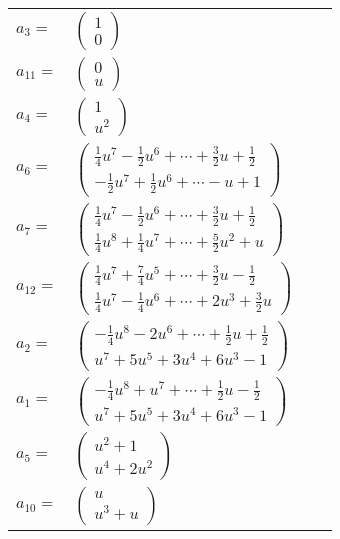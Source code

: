 \documentclass[1p]{elsarticle_modified}
\theoremstyle{definition}
\begin{document}
\begin{tabular}{m{7pt} m{180pt} m{7pt} m{180pt} }
\flushright $a_{3}=$&$\begin{pmatrix}1\\0\end{pmatrix}$ \\
\flushright $a_{11}=$&$\begin{pmatrix}0\\u\end{pmatrix}$ \\
\flushright $a_{4}=$&$\begin{pmatrix}1\\u^2\end{pmatrix}$ \\
\flushright $a_{6}=$&$\begin{pmatrix}\frac{1}{4} u^7-\frac{1}{2} u^6+\cdots+\frac{3}{2} u+\frac{1}{2}\\-\frac{1}{2} u^7+\frac{1}{2} u^6+\cdots- u+1\end{pmatrix}$ \\
\flushright $a_{7}=$&$\begin{pmatrix}\frac{1}{4} u^7-\frac{1}{2} u^6+\cdots+\frac{3}{2} u+\frac{1}{2}\\\frac{1}{4} u^8+\frac{1}{4} u^7+\cdots+\frac{5}{2} u^2+u\end{pmatrix}$ \\
\flushright $a_{12}=$&$\begin{pmatrix}\frac{1}{4} u^7+\frac{7}{4} u^5+\cdots+\frac{3}{2} u-\frac{1}{2}\\\frac{1}{4} u^7-\frac{1}{4} u^6+\cdots+2 u^3+\frac{3}{2} u\end{pmatrix}$ \\
\flushright $a_{2}=$&$\begin{pmatrix}-\frac{1}{4} u^8-2 u^6+\cdots+\frac{1}{2} u+\frac{1}{2}\\u^7+5 u^5+3 u^4+6 u^3-1\end{pmatrix}$ \\
\flushright $a_{1}=$&$\begin{pmatrix}-\frac{1}{4} u^8+u^7+\cdots+\frac{1}{2} u-\frac{1}{2}\\u^7+5 u^5+3 u^4+6 u^3-1\end{pmatrix}$ \\
\flushright $a_{5}=$&$\begin{pmatrix}u^2+1\\u^4+2 u^2\end{pmatrix}$ \\
\flushright $a_{10}=$&$\begin{pmatrix}u\\u^3+u\end{pmatrix}$ \\

\end{tabular}
\end{document}
